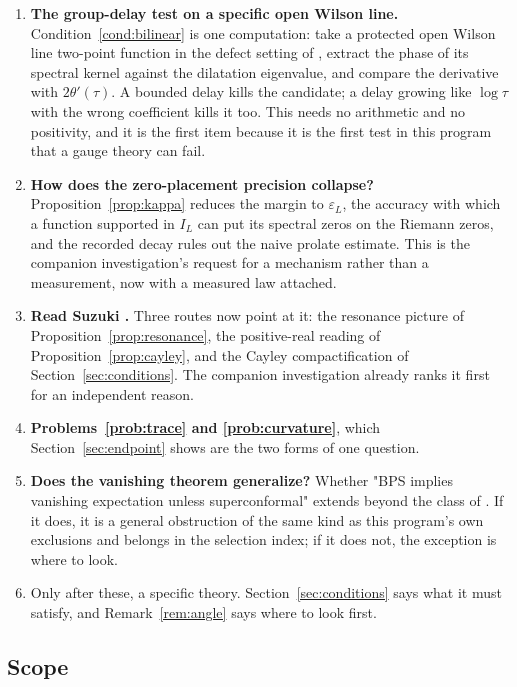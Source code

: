 \begin{enumerate}
\item \textbf{The group-delay test on a specific open Wilson line.}
Condition~\ref{cond:bilinear} is one computation: take a protected open Wilson
line two-point function in the defect setting of \cite{OWL}, extract the phase of
its spectral kernel against the dilatation eigenvalue, and compare the derivative
with $2\theta'(\tau)$. A bounded delay kills the candidate; a delay growing like
$\log\tau$ with the wrong coefficient kills it too. This needs no arithmetic and
no positivity, and it is the first item because it is the first test in this
program that a gauge theory can fail.

\item \textbf{How does the zero-placement precision collapse?}
Proposition~\ref{prop:kappa} reduces the margin to $\varepsilon_L$, the accuracy
with which a function supported in $I_L$ can put its spectral zeros on the
Riemann zeros, and the recorded decay rules out the naive prolate estimate. This
is the companion investigation's request for a mechanism rather than a
measurement, now with a measured law attached.

\item \textbf{Read Suzuki \cite{SuzukiDeBranges}.} Three routes now point at it:
the resonance picture of Proposition~\ref{prop:resonance}, the positive-real
reading of Proposition~\ref{prop:cayley}, and the Cayley compactification of
Section~\ref{sec:conditions}. The companion investigation already ranks it first
for an independent reason.

\item \textbf{Problems~\ref{prob:trace} and \ref{prob:curvature}}, which
Section~\ref{sec:endpoint} shows are the two forms of one question.

\item \textbf{Does the vanishing theorem generalize?} Whether "BPS implies
vanishing expectation unless superconformal" extends beyond the class of
\cite{OWL}. If it does, it is a general obstruction of the same kind as this
program's own exclusions and belongs in the selection index; if it does not, the
exception is where to look.

\item Only after these, a specific theory. Section~\ref{sec:conditions} says what
it must satisfy, and Remark~\ref{rem:angle} says where to look first.
\end{enumerate}

\subsection{Scope}

